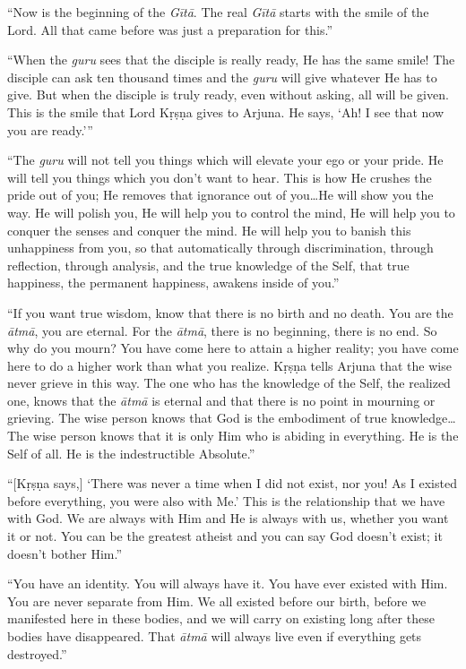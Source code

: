 \enquote{Now is the beginning of the \textit{Gītā}. The real \textit{Gītā} starts with the smile of the Lord. All that came before was just a preparation for this.}

\enquote{When the \textit{guru} sees that the disciple is really ready, He has the same smile! The disciple can ask ten thousand times and the \textit{guru} will give whatever He has to give. But when the disciple is truly ready, even without asking, all will be given. This is the smile that Lord Kṛṣṇa gives to Arjuna. He says, \enquote{Ah! I see that now you are ready.}}

\enquote{The \textit{guru} will not tell you things which will elevate your ego or your pride. He will tell you things which you don’t want to hear. This is how He crushes the pride out of you; He removes that ignorance out of you\ldots He will show you the way. He will polish you, He will help you to control the mind, He will help you to conquer the senses and conquer the mind. He will help you to banish this unhappiness from you, so that automatically through discrimination, through reflection, through analysis, and the true knowledge of the Self, that true happiness, the permanent happiness, awakens inside of you.}

\enquote{If you want true wisdom, know that there is no birth and no death. You are the \textit{ātmā}, you are eternal. For the \textit{ātmā}, there is no beginning, there is no end. So why do you mourn? You have come here to attain a higher reality; you have come here to do a higher work than what you realize. Kṛṣṇa tells Arjuna that the wise never grieve in this way. The one who has the knowledge of the Self, the realized one, knows that the \textit{ātmā} is eternal and that there is no point in mourning or grieving. The wise person knows that God is the embodiment of true knowledge\ldots The wise person knows that it is only Him who is abiding in everything. He is the Self of all. He is the indestructible Absolute.}

\enquote{[Kṛṣṇa says,] \enquote{There was never a time when I did not exist, nor you! As I existed before everything, you were also with Me.} This is the relationship that we have with God. We are always with Him and He is always with us, whether you want it or not. You can be the greatest atheist and you can say God doesn’t exist; it doesn’t bother Him.}

\enquote{You have an identity. You will always have it. You have ever existed with Him. You are never separate from Him. We all existed before our birth, before we manifested here in these bodies, and we will carry on existing long after these bodies have disappeared. That \textit{ātmā} will always live even if everything gets destroyed.}

